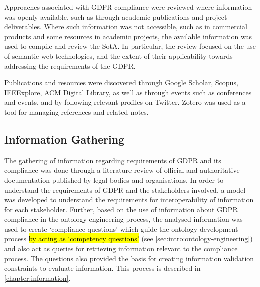 Approaches associated with GDPR compliance were reviewed where information was openly available, such as through academic publications and project deliverables.
Where such information was not accessible, such as in commercial products and some resources in academic projects, the available information was used to compile and review the SotA.
In particular, the review focused on the use of semantic web technologies, and the extent of their applicability towards addressing the requirements of the GDPR.

Publications and resources were discovered through Google Scholar, Scopus, IEEExplore, ACM Digital Library, as well as through events such as conferences and events, and by following relevant profiles on Twitter.
Zotero was used as a tool for managing references and related notes.

\subsection{Information Gathering}
The gathering of information regarding requirements of GDPR and its compliance was done through a literature review of official and authoritative documentation published by legal bodies and organisations.
In order to understand the requirements of GDPR and the stakeholders involved, a model was developed to understand the requirements for interoperability of information for each stakeholder.
Further, based on the use of information about GDPR compliance in the ontology engineering process, the analysed information was used to create `compliance questions' which guide the ontology development process \hl{by acting as `competency questions'} (see \autoref{sec:intro:ontology-engineering}) and also act as queries for retrieving information relevant to the compliance process. The questions also provided the basis for creating information validation constraints to evaluate information.
This process is described in \autoref{chapter:information}.

